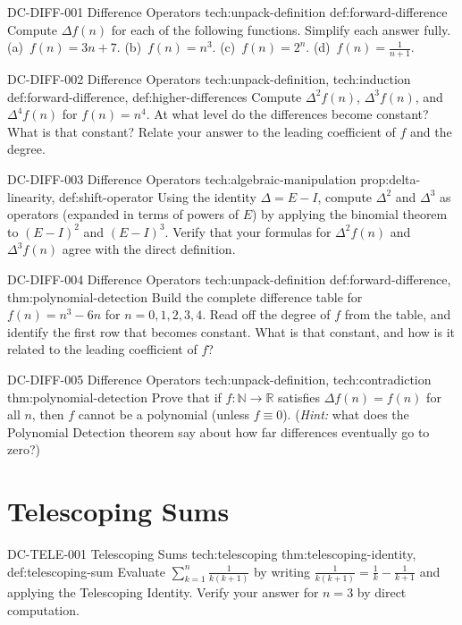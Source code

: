 \exstubgenfull
  {DC-DIFF-001}
  {Difference Operators}
  {tech:unpack-definition}
  {def:forward-difference}
  {Compute \(\Delta f(n)\) for each of the following functions.
  Simplify each answer fully.
  (a)~\(f(n) = 3n + 7\).
  (b)~\(f(n) = n^3\).
  (c)~\(f(n) = 2^n\).
  (d)~\(f(n) = \frac{1}{n+1}\).}

\exstubgenfull
  {DC-DIFF-002}
  {Difference Operators}
  {tech:unpack-definition, tech:induction}
  {def:forward-difference, def:higher-differences}
  {Compute \(\Delta^2 f(n)\), \(\Delta^3 f(n)\), and \(\Delta^4 f(n)\) for
  \(f(n) = n^4\). At what level do the differences become constant?
  What is that constant? Relate your answer to the leading coefficient
  of \(f\) and the degree.}

\exstubgenfull
  {DC-DIFF-003}
  {Difference Operators}
  {tech:algebraic-manipulation}
  {prop:delta-linearity, def:shift-operator}
  {Using the identity \(\Delta = E - I\), compute \(\Delta^2\) and \(\Delta^3\)
  as operators (expanded in terms of powers of \(E\)) by applying the binomial
  theorem to \((E-I)^2\) and \((E-I)^3\). Verify that your formulas for
  \(\Delta^2 f(n)\) and \(\Delta^3 f(n)\) agree with the direct definition.}

\exstubgenfull
  {DC-DIFF-004}
  {Difference Operators}
  {tech:unpack-definition}
  {def:forward-difference, thm:polynomial-detection}
  {Build the complete difference table for \(f(n) = n^3 - 6n\) for
  \(n = 0, 1, 2, 3, 4\). Read off the degree of \(f\) from the table,
  and identify the first row that becomes constant. What is that constant,
  and how is it related to the leading coefficient of \(f\)?}

\exstubgenfull
  {DC-DIFF-005}
  {Difference Operators}
  {tech:unpack-definition, tech:contradiction}
  {thm:polynomial-detection}
  {Prove that if \(f : \mathbb{N} \to \mathbb{R}\) satisfies
  \(\Delta f(n) = f(n)\) for all \(n\), then \(f\) cannot be a
  polynomial (unless \(f \equiv 0\)). (\emph{Hint:} what does the
  Polynomial Detection theorem say about how far differences eventually
  go to zero?)}

\section*{Telescoping Sums}

\exstubgenfull
  {DC-TELE-001}
  {Telescoping Sums}
  {tech:telescoping}
  {thm:telescoping-identity, def:telescoping-sum}
  {Evaluate \(\displaystyle\sum_{k=1}^{n}\frac{1}{k(k+1)}\) by writing
  \(\frac{1}{k(k+1)} = \frac{1}{k} - \frac{1}{k+1}\) and applying the
  Telescoping Identity. Verify your answer for \(n = 3\) by direct
  computation.}

